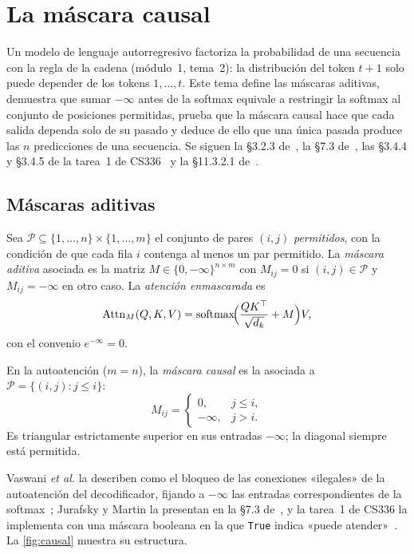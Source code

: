 \chapter{La máscara causal}
\label{tema:3}

Un modelo de lenguaje autorregresivo factoriza la probabilidad de una secuencia con la regla de la cadena (módulo~1, tema~2): la distribución del token $t+1$ solo puede depender de los tokens $1,\dots,t$. Este tema define las máscaras aditivas, demuestra que sumar $-\infty$ antes de la softmax equivale a restringir la softmax al conjunto de posiciones permitidas, prueba que la máscara causal hace que cada salida dependa solo de su pasado y deduce de ello que una única pasada produce las $n$ predicciones de una secuencia. Se siguen la §3.2.3 de~\cite{vaswani}, la §7.3 de~\cite{jm3}, las §3.4.4 y §3.4.5 de la tarea~1 de CS336~\cite{cs336} y la §11.3.2.1 de~\cite{d2l}.

\section{Máscaras aditivas}

\begin{definicion}\label{def:mascara}
Sea $\mathcal{P}\subseteq\{1,\dots,n\}\times\{1,\dots,m\}$ el conjunto de pares $(i,j)$ \emph{permitidos}, con la condición de que cada fila $i$ contenga al menos un par permitido. La \emph{máscara aditiva} asociada es la matriz $M\in\{0,-\infty\}^{n\times m}$ con $M_{ij}=0$ si $(i,j)\in\mathcal{P}$ y $M_{ij}=-\infty$ en otro caso. La \emph{atención enmascarada} es
\[
\operatorname{Attn}_M(Q,K,V)=\operatorname{softmax}\!\Bigl(\frac{QK^{\top}}{\sqrt{d_k}}+M\Bigr)V,
\]
con el convenio $e^{-\infty}=0$.
\end{definicion}

\begin{definicion}\label{def:causal}
En la autoatención ($m=n$), la \emph{máscara causal} es la asociada a $\mathcal{P}=\{(i,j):j\le i\}$:
\[
M_{ij}=\begin{cases}0,& j\le i,\\-\infty,& j>i.\end{cases}
\]
Es triangular estrictamente superior en sus entradas $-\infty$; la diagonal siempre está permitida.
\end{definicion}

Vaswani \emph{et al.} la describen como el bloqueo de las conexiones «ilegales» de la autoatención del decodificador, fijando a $-\infty$ las entradas correspondientes de la softmax~\cite[§3.2.3]{vaswani}; Jurafsky y Martin la presentan en la §7.3 de~\cite{jm3}, y la tarea~1 de CS336 la implementa con una máscara booleana en la que \texttt{True} indica «puede atender»~\cite[§3.4.4]{cs336}. La \cref{fig:causal} muestra su estructura.

